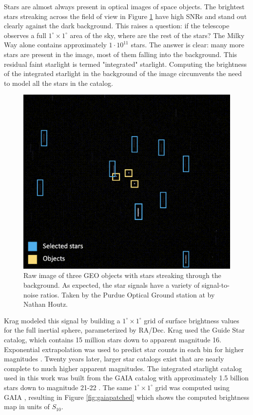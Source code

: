 Stars are almost always present in optical images of space objects. The brightest stars streaking across the field of view in Figure \ref{fig:pogs_observation_example} have high SNRs and stand out clearly against the dark background. This raises a question: if the telescope observes a full $1^\circ \times 1^\circ$ area of the sky, where are the rest of the stars? The Milky Way alone contains approximately $1\cdot10^{11}$ stars. The answer is clear: many more stars are present in the image, most of them falling into the background. This residual faint starlight is termed "integrated" starlight. Computing the brightness of the integrated starlight in the background of the image circumvents the need to model all the stars in the catalog.

\begin{figure}[ht]
  \centering
  \includegraphics[width=\figmed]{static_images/static_pogs_annotated.png}
  \caption{Raw image of three GEO objects with stars streaking through the background. As expected, the star signals have a variety of signal-to-noise ratios. Taken by the Purdue Optical Ground station at \pogslla by Nathan Houtz.}
  \label{fig:pogs_observation_example}
\end{figure}

Krag \cite{krag2003} modeled this signal by building a $1^\circ \times 1^\circ$ grid of surface
brightness values for the full inertial sphere, parameterized by RA/Dec. Krag used the
Guide Star catalog, which contains 15 million stars down to apparent magnitude 16. Exponential extrapolation
was used to predict star counts in each bin for higher magnitudes \cite{krag2003}. Twenty years later, larger star catalogs exist that are nearly complete to much higher apparent magnitudes. The integrated
starlight catalog used in this work was built from the GAIA catalog with approximately 1.5 billion
stars down to magnitude 21-22 \cite{gaia_dr3}. The same $1^\circ \times 1^\circ$ grid was computed
using GAIA \cite{astroquery_gaia}, resulting in Figure
\ref{fig:gaiapatched} which shows the computed brightness map in units of $S_{10}$. 

